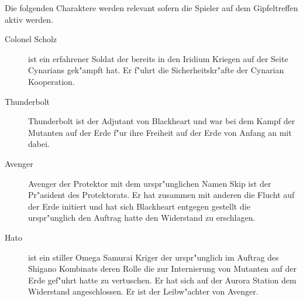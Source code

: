 
Die folgenden Charaktere werden relevant sofern die Spieler auf dem Gipfeltreffen aktiv werden.

\begin{description}
    \item[Colonel Scholz] ist ein erfahrener Soldat der bereits in den Iridium Kriegen auf der Seite Cynarians gek"ampft hat. Er f"uhrt 
        die Sicherheitskr"afte der Cynarian Kooperation.
    \item[Thunderbolt] Thunderbolt ist der Adjutant von Blackheart und war bei dem Kampf der Mutanten auf der Erde f"ur ihre Freiheit auf 
        der Erde von Anfang an mit dabei.
    \item[Avenger] Avenger der Protektor mit dem urspr"unglichen Namen Skip ist der Pr"asident des Protektorats. Er hat zusammen mit 
        anderen die Flucht auf der Erde initiert und hat sich Blackheart entgegen gestellt die urspr"unglich den Auftrag hatte den Widerstand zu erschlagen.
    \item[Hato] ist ein stiller Omega Samurai Kriger der urspr"unglich im Auftrag des Shigano Kombinats deren Rolle die zur Internierung 
        von Mutanten auf der Erde gef"uhrt hatte zu vertuschen. Er hat sich auf der Aurora Station dem Widerstand angeschlossen. Er ist der Leibw"achter von Avenger.
\end{description}

